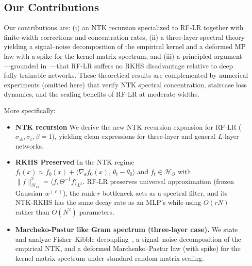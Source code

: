 \subsection*{Our Contributions}
Our contributions are: (i) an NTK recursion specialized to RF-LR together with finite-width corrections and concentration rates, (ii) a three-layer spectral theory yielding a signal–noise decomposition of the empirical kernel and a deformed MP law with a spike for the kernel matrix spectrum, and (iii) a principled argument—grounded in~\cite{bietti2021deepequalsshallowrelu}—that RF-LR suffers no RKHS disadvantage relative to deep fully-trainable networks. These theoretical results are complemented by numerical experiments (omitted here) that verify NTK spectral concentration, staircase loss dynamics, and the scaling benefits of RF-LR at moderate widths.

More specifically:
\begin{itemize}
    \item \textbf{NTK recursion} We derive the new NTK recursion expansion for RF-LR (\( \sigma_A, \sigma_c, \beta = 1 \)), yielding clean expressions for three-layer and general \( L \)-layer networks.
    \item \textbf{RKHS Preserved} In the NTK regime \( f_t(x)\!\approx\! f_0(x)+\langle\nabla_\theta f_0(x),\,\theta_t-\theta_0\rangle \) and \( f_t\in\mathcal{H}_\Theta \) with \( \|f\|_{\mathcal{H}_\Theta}^2=\langle f,\Theta^{-1}f\rangle_{L^2} \). RF‑LR preserves universal approximation (frozen Gaussian \( w^{(\ell)} \)), the rank‑\(r\) bottleneck acts as a spectral filter, and its NTK‑RKHS has the same decay rate as an MLP's while using \(O(rN)\) rather than \(O(N^2)\) parameters.
    \item \textbf{Marcheko-Pastur like Gram spectrum (three-layer case).} We state and analyze Fisher–Kibble decoupling~\cite{fisher1915probable,hotelling1953new}, a signal–noise decomposition of the empirical NTK, and a deformed Marchenko–Pastur law (with spike) for the kernel matrix spectrum under standard random matrix scaling.
\end{itemize}
